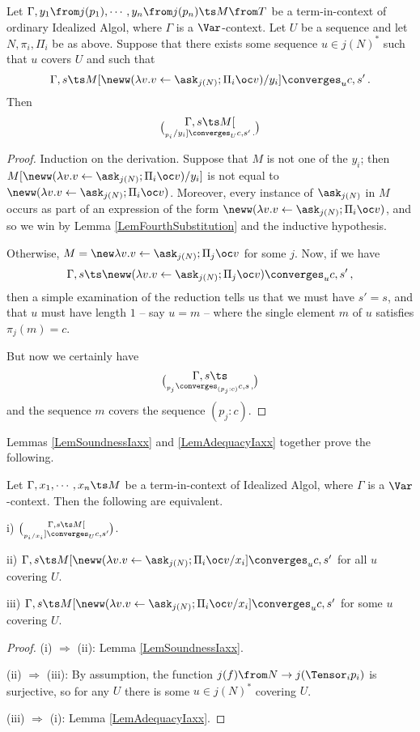 \begin{lemma}
  Let $\Gamma,y_1\from j(p_1),\cdots,y_n\from j(p_n) \ts M \from T$ be a term-in-context of ordinary Idealized Algol, where $\Gamma$ is a $\Var$-context.  
  Let $U$ be a sequence and let $N,\pi_i,\Pi_i$ be as above.
  Suppose that there exists some sequence $u\in j(N)^*$ such that $u$ covers $U$ and such that
  \[
    \Gamma,s\ts M[\neww(\lambda v.v\gets \ask_{j(N)};\Pi_i \oc v)/y_i]\converges_u c,s'\,.
    \]
  Then
  \[
    \Gamma,s\ts M[\choose_{p_i}/y_i] \converges_U c,s'\,.
    \]
  \label{LemAdequacyIaxx}
\end{lemma}
\begin{proof}
  Induction on the derivation.
  Suppose that $M$ is not one of the $y_i$; then $M[\neww(\lambda v.v\gets\ask_{j(N)};\Pi_i \oc v)/y_i]$ is not equal to $\neww(\lambda v.v\gets\ask_{j(N)};\Pi_i \oc v)$.
  Moreover, every instance of $\ask_{j(N)}$ in $M$ occurs as part of an expression of the form $\neww(\lambda v.v\gets\ask_{j(N)};\Pi_i \oc v)$, and so we win by Lemma \ref{LemFourthSubstitution} and the inductive hypothesis.

  Otherwise, $M=\new\lambda v.v\gets \ask_{j(N)};\Pi_j\oc v$ for some $j$.  
  Now, if we have
  \[
    \Gamma,s\ts \neww(\lambda v.v\gets\ask_{j(N)};\Pi_j\oc v)\converges_u c,s'\,,
    \]
  then a simple examination of the reduction tells us that we must have $s'=s$, and that $u$ must have length $1$ -- say $u=m$ -- where the single element $m$ of $u$ satisfies $\pi_j(m)=c$.

  But now we certainly have
  \[
    \Gamma,s\ts \choose_{p_j} \converges_{(p_j:c)} c,s\,,
    \]
  and the sequence $m$ covers the sequence $(p_j:c)$.
\end{proof}

Lemmas \ref{LemSoundnessIaxx} and \ref{LemAdequacyIaxx} together prove the following.

\begin{lemma}
  Let $\Gamma,x_1,\cdots,x_n\ts M$ be a term-in-context of Idealized Algol, where $\Gamma$ is a $\Var$-context.
  Then the following are equivalent.

  i) $\Gamma,s\ts M[\choose_{p_i/x_i}]\converges_U c,s'$.
  
  ii) $\Gamma,s\ts M[\neww(\lambda v.v\gets\ask_{j(N)};\Pi_i \oc v/x_i]\converges_u c,s'$ for all $u$ covering $U$.

  iii) $\Gamma,s\ts M[\neww(\lambda v.v\gets\ask_{j(N)};\Pi_i \oc v/x_i]\converges_u c,s'$ for some $u$ covering $U$.
  \label{LemComputationalAdequacyIaxx}
\end{lemma}
\begin{proof}
  (i) $\Rightarrow$ (ii): Lemma \ref{LemSoundnessIaxx}.

  (ii) $\Rightarrow$ (iii): By assumption, the function $j(f) \from N \to j(\Tensor_i p_i)$ is surjective, so for any $U$ there is some $u\in j(N)^*$ covering $U$.

  (iii) $\Rightarrow$ (i): Lemma \ref{LemAdequacyIaxx}.
\end{proof}

